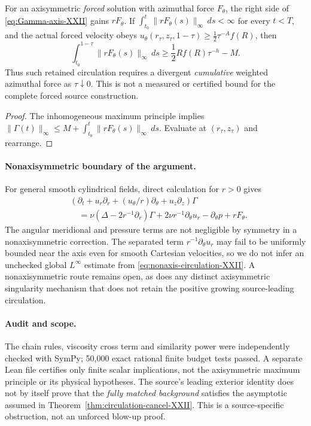 \begin{corollary}
For an axisymmetric \emph{forced} solution with azimuthal force $F_\theta$,
the right side of \eqref{eq:Gamma-axis-XXII} gains $rF_\theta$.
If $\int_{t_0}^{t}\|rF_\theta(s)\|_\infty\,ds<\infty$ for every
$t<T$, and the actual forced velocity obeys
$u_\theta(r_\tau,z_\tau,1-\tau)\ge\frac12\tau^{-A}f(R)$,
then
\begin{equation}\label{eq:force-budget-XXII}
 \int_{t_0}^{1-\tau}\|rF_\theta(s)\|_\infty\,ds
 \ge\frac12 Rf(R)\tau^{-h}-M.
\end{equation}
Thus such retained circulation requires a divergent \emph{cumulative}
weighted azimuthal force as $\tau\downarrow0$. This is not a measured
or certified bound for the complete forced source construction.
\end{corollary}
\begin{proof}
The inhomogeneous maximum principle implies
$\|\Gamma(t)\|_\infty\le
 M+\int_{t_0}^t\|rF_\theta(s)\|_\infty\,ds$.
Evaluate at $(r_\tau,z_\tau)$ and rearrange.
\end{proof}

\paragraph{Nonaxisymmetric boundary of the argument.}
For general smooth cylindrical fields, direct calculation for $r>0$
gives
\begin{equation}\label{eq:nonaxis-circulation-XXII}
\begin{aligned}
 &(\partial_t+u_r\partial_r+(u_\theta/r)\partial_\theta
     +u_z\partial_z)\Gamma\\
 &\quad=\nu(\Delta-2r^{-1}\partial_r)\Gamma
      +2\nu r^{-1}\partial_\theta u_r-\partial_\theta p
      +rF_\theta.
\end{aligned}
\end{equation}
The angular meridional and pressure terms are not negligible by
symmetry in a nonaxisymmetric correction. The separated term
$r^{-1}\partial_\theta u_r$ may fail to be uniformly bounded near
the axis even for smooth Cartesian velocities, so we do not infer
an unchecked global $L^\infty$ estimate from
\eqref{eq:nonaxis-circulation-XXII}. A nonaxisymmetric route remains
open, as does any distinct axisymmetric singularity mechanism that
does not retain the positive growing source-leading circulation.

\paragraph{Audit and scope.}
The chain rules, viscosity cross term and similarity power were
independently checked with SymPy; 50,000 exact rational finite budget
tests passed. A separate Lean file certifies only finite scalar
implications, not the axisymmetric maximum principle or its physical
hypotheses. The source's leading exterior identity does not by itself
prove that the \emph{fully matched background} satisfies the asymptotic
assumed in Theorem~\ref{thm:circulation-cancel-XXII}. This is a
source-specific obstruction, not an unforced blow-up proof.

